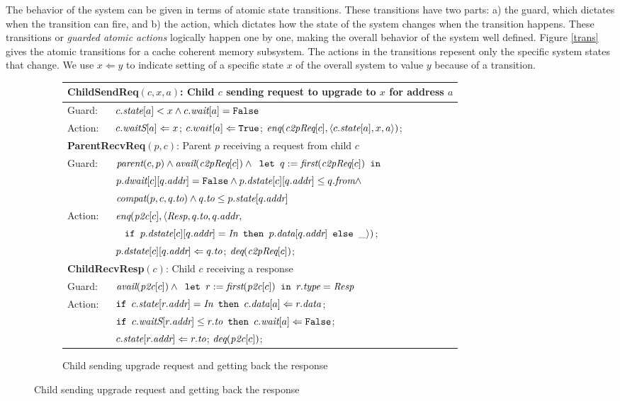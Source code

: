 The behavior of the system can be given in terms of atomic state transitions.
These transitions have two parts: a) the guard, which dictates when the
transition can fire, and b) the action, which dictates how the state of the
system changes when the transition happens. These transitions or \emph{guarded
atomic actions} logically happen one by one, making the overall behavior of the
system well defined. Figure \ref{trans} gives the atomic transitions for a
cache coherent memory subsystem. The actions in the transitions repesent only
the specific system states that change. We use $x \Leftarrow y$ to indicate
setting of a specific state $x$ of the overall system to value $y$ because of a
transition.
\begin{figure}
\small
\centering
\begin{subfigure}{\textwidth}
\centering
\begin{tabular}{|ll|}
\hline
\multicolumn{2}{|l|}{\textbf{ChildSendReq}$(c, x, a)$: Child $c$ sending request to upgrade to $x$ for address $a$}\\
\hline
Guard: & $c.\textit{state}[a] < x \wedge c.\textit{wait}[a] = \texttt{False}$\\
\hline
Action: & $c.\textit{waitS}[a] \Leftarrow x$; $c.wait[a] \Leftarrow \texttt{True}$; $\textit{enq}(\textit{c2pReq}[c], \langle c.\textit{state}[a], x, a \rangle)$;\\
\hline
\hline
\multicolumn{2}{|l|}{\textbf{ParentRecvReq}$(p, c)$: Parent $p$ receiving a request from child $c$}\\
\hline
Guard: & 
$\textit{parent}(c,p) \wedge \textit{avail}(\textit{c2pReq}[c]) \wedge \texttt{ let } q := \textit{first}(\textit{c2pReq}[c]) \texttt{ in }$\\
& $p.\textit{dwait}[c][q.\textit{addr}] = \texttt{False} \wedge p.\textit{dstate}[c][q.\textit{addr}] \le q.\textit{from} \wedge$\\
& $\textit{compat}(p, c, q.\textit{to}) \wedge q.\textit{to} \le p.\textit{state}[q.\textit{addr}]$\\
\hline
Action: & $\textit{enq}(\textit{p2c}[c], \langle \textit{Resp}, q.\textit{to}, q.\textit{addr}, $\\
& $\;\;\;%
\myif p.\dstate[c][q.\addr] = \In \mythen p.\data[q.\addr] \myelse \_\rangle)$;\\
& $p.\textit{dstate}[c][q.\textit{addr}] \Leftarrow q.\textit{to}$; $\textit{deq}(\textit{c2pReq}[c])$;\\
\hline
\hline
\multicolumn{2}{|l|}{\textbf{ChildRecvResp}$(c)$: Child $c$ receiving a response}\\
\hline
Guard: & 
$\textit{avail}(\textit{p2c}[c]) \wedge \texttt{ let } r := \textit{first}(\textit{p2c}[c]) \texttt{ in } r.\textit{type} = \textit{Resp}$\\
\hline
Action: & $\texttt{if } c.\textit{state}[r.\textit{addr}] = \textit{In} \texttt{ then } c.\textit{data}[a] \Leftarrow r.\textit{data}$;\\
&$\texttt{if } c.\textit{waitS}[r.\textit{addr}] \le r.\textit{to} \texttt{ then } c.\textit{wait}[a] \Leftarrow \texttt{False} $;\\
& $c.\textit{state}[r.\textit{addr}] \Leftarrow r.\textit{to}$; $\textit{deq}(\textit{p2c}[c])$;\\
\hline
\end{tabular}
\caption{Child sending upgrade request and getting back the response}
\end{subfigure}


\end{figure}
